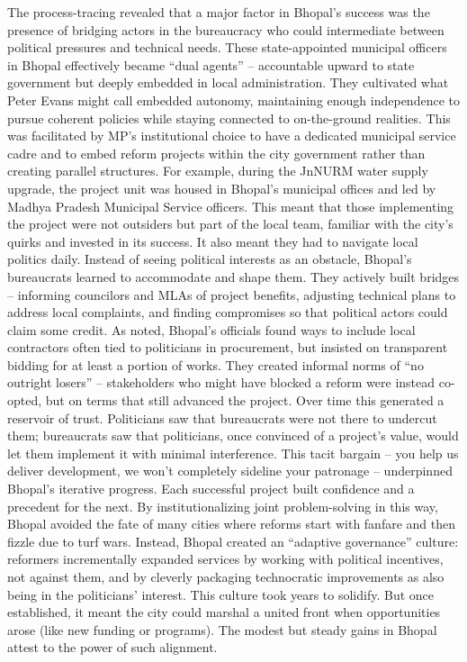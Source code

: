 The process-tracing revealed that a major factor in Bhopal's success was the presence of bridging actors in the bureaucracy who could intermediate between political pressures and technical needs. These state-appointed municipal officers in Bhopal effectively became ``dual agents'' – accountable upward to state government but deeply embedded in local administration. They cultivated what Peter Evans might call embedded autonomy, maintaining enough independence to pursue coherent policies while staying connected to on-the-ground realities. This was facilitated by MP's institutional choice to have a dedicated municipal service cadre and to embed reform projects within the city government rather than creating parallel structures. For example, during the JnNURM water supply upgrade, the project unit was housed in Bhopal's municipal offices and led by Madhya Pradesh Municipal Service officers. This meant that those implementing the project were not outsiders but part of the local team, familiar with the city's quirks and invested in its success. It also meant they had to navigate local politics daily. Instead of seeing political interests as an obstacle, Bhopal's bureaucrats learned to accommodate and shape them. They actively built bridges – informing councilors and MLAs of project benefits, adjusting technical plans to address local complaints, and finding compromises so that political actors could claim some credit. As noted, Bhopal's officials found ways to include local contractors often tied to politicians in procurement, but insisted on transparent bidding for at least a portion of works. They created informal norms of ``no outright losers'' – stakeholders who might have blocked a reform were instead co-opted, but on terms that still advanced the project. Over time this generated a reservoir of trust. Politicians saw that bureaucrats were not there to undercut them; bureaucrats saw that politicians, once convinced of a project's value, would let them implement it with minimal interference. This tacit bargain – you help us deliver development, we won't completely sideline your patronage – underpinned Bhopal's iterative progress. Each successful project built confidence and a precedent for the next. By institutionalizing joint problem-solving in this way, Bhopal avoided the fate of many cities where reforms start with fanfare and then fizzle due to turf wars. Instead, Bhopal created an ``adaptive governance'' culture: reformers incrementally expanded services by working with political incentives, not against them, and by cleverly packaging technocratic improvements as also being in the politicians' interest. This culture took years to solidify. But once established, it meant the city could marshal a united front when opportunities arose (like new funding or programs). The modest but steady gains in Bhopal attest to the power of such alignment.

